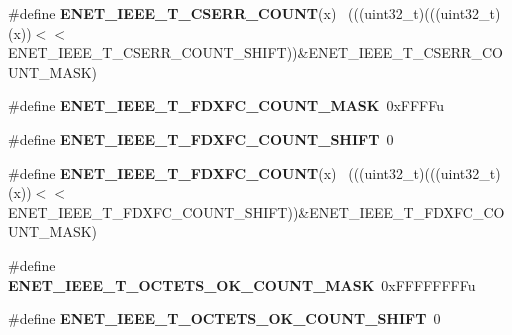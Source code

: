 \begin{DoxyCompactItemize}
\item 
\hypertarget{group___e_n_e_t___register___masks_ga1e066daf70bff1c1a988d16bee65d303}{}\#define {\bfseries E\+N\+E\+T\+\_\+\+I\+E\+E\+E\+\_\+\+T\+\_\+\+C\+S\+E\+R\+R\+\_\+\+C\+O\+U\+N\+T}(x)                          ~(((uint32\+\_\+t)(((uint32\+\_\+t)(x))$<$$<$E\+N\+E\+T\+\_\+\+I\+E\+E\+E\+\_\+\+T\+\_\+\+C\+S\+E\+R\+R\+\_\+\+C\+O\+U\+N\+T\+\_\+\+S\+H\+I\+F\+T))\&E\+N\+E\+T\+\_\+\+I\+E\+E\+E\+\_\+\+T\+\_\+\+C\+S\+E\+R\+R\+\_\+\+C\+O\+U\+N\+T\+\_\+\+M\+A\+S\+K)\label{group___e_n_e_t___register___masks_ga1e066daf70bff1c1a988d16bee65d303}

\item 
\hypertarget{group___e_n_e_t___register___masks_gab017cc2737c10a8709398a3a47dc3ade}{}\#define {\bfseries E\+N\+E\+T\+\_\+\+I\+E\+E\+E\+\_\+\+T\+\_\+\+F\+D\+X\+F\+C\+\_\+\+C\+O\+U\+N\+T\+\_\+\+M\+A\+S\+K}~0x\+F\+F\+F\+Fu\label{group___e_n_e_t___register___masks_gab017cc2737c10a8709398a3a47dc3ade}

\item 
\hypertarget{group___e_n_e_t___register___masks_ga122b6e4e5176d31a1f66b7f04c18826f}{}\#define {\bfseries E\+N\+E\+T\+\_\+\+I\+E\+E\+E\+\_\+\+T\+\_\+\+F\+D\+X\+F\+C\+\_\+\+C\+O\+U\+N\+T\+\_\+\+S\+H\+I\+F\+T}~0\label{group___e_n_e_t___register___masks_ga122b6e4e5176d31a1f66b7f04c18826f}

\item 
\hypertarget{group___e_n_e_t___register___masks_gab9989c1d6a4adad49738d659003994b0}{}\#define {\bfseries E\+N\+E\+T\+\_\+\+I\+E\+E\+E\+\_\+\+T\+\_\+\+F\+D\+X\+F\+C\+\_\+\+C\+O\+U\+N\+T}(x)                          ~(((uint32\+\_\+t)(((uint32\+\_\+t)(x))$<$$<$E\+N\+E\+T\+\_\+\+I\+E\+E\+E\+\_\+\+T\+\_\+\+F\+D\+X\+F\+C\+\_\+\+C\+O\+U\+N\+T\+\_\+\+S\+H\+I\+F\+T))\&E\+N\+E\+T\+\_\+\+I\+E\+E\+E\+\_\+\+T\+\_\+\+F\+D\+X\+F\+C\+\_\+\+C\+O\+U\+N\+T\+\_\+\+M\+A\+S\+K)\label{group___e_n_e_t___register___masks_gab9989c1d6a4adad49738d659003994b0}

\item 
\hypertarget{group___e_n_e_t___register___masks_ga6f934fd96f95ccb0d4faa6c215f86cf7}{}\#define {\bfseries E\+N\+E\+T\+\_\+\+I\+E\+E\+E\+\_\+\+T\+\_\+\+O\+C\+T\+E\+T\+S\+\_\+\+O\+K\+\_\+\+C\+O\+U\+N\+T\+\_\+\+M\+A\+S\+K}~0x\+F\+F\+F\+F\+F\+F\+F\+Fu\label{group___e_n_e_t___register___masks_ga6f934fd96f95ccb0d4faa6c215f86cf7}

\item 
\hypertarget{group___e_n_e_t___register___masks_ga56ee9e359f04a1e6250f1fb5bf0ce288}{}\#define {\bfseries E\+N\+E\+T\+\_\+\+I\+E\+E\+E\+\_\+\+T\+\_\+\+O\+C\+T\+E\+T\+S\+\_\+\+O\+K\+\_\+\+C\+O\+U\+N\+T\+\_\+\+S\+H\+I\+F\+T}~0\label{group___e_n_e_t___register___masks_ga56ee9e359f04a1e6250f1fb5bf0ce288}


\end{DoxyCompactItemize}
